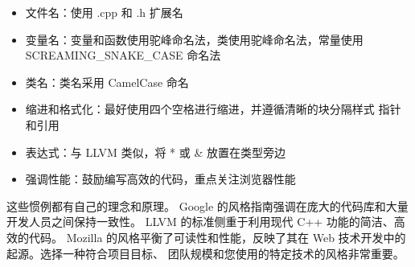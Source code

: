 \begin{itemize}
\begin{itemize}
\item
文件名：使用 .cpp 和 .h 扩展名

\item
变量名：变量和函数使用驼峰命名法，类使用驼峰命名法，常量使用 SCREAMING\_SNAKE\_CASE 命名法

\item
类名：类名采用 CamelCase 命名

\item
缩进和格式化：最好使用四个空格进行缩进，并遵循清晰的块分隔样式 指针和引用

\item
表达式：与 LLVM 类似，将 * 或 \& 放置在类型旁边

\item
强调性能：鼓励编写高效的代码，重点关注浏览器性能
\end{itemize}
\end{itemize}

这些惯例都有自己的理念和原理。 Google 的风格指南强调在庞大的代码库和大量开发人员之间保持一致性。 LLVM 的标准侧重于利用现代 C++ 功能的简洁、高效的代码。 Mozilla 的风格平衡了可读性和性能，反映了其在 Web 技术开发中的起源。选择一种符合项目目标、 团队规模和您使用的特定技术的风格非常重要。


















